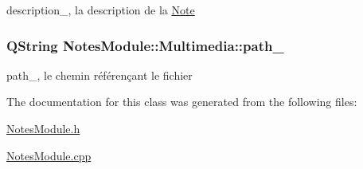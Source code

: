 description\-\_\-, la description de la \hyperlink{class_notes_module_1_1_note}{Note} 

\hypertarget{class_notes_module_1_1_multimedia_af00afad489194bafcbf6c726cce7d496}{
\subsubsection[{path\-\_\-}]{\setlength{\rightskip}{0pt plus 5cm}Q\-String Notes\-Module\-::\-Multimedia\-::path\-\_\-\hspace{0.3cm}{\ttfamily [protected]}}}\label{class_notes_module_1_1_multimedia_af00afad489194bafcbf6c726cce7d496}


path\-\_\-, le chemin référençant le fichier 



The documentation for this class was generated from the following files\-:\begin{DoxyCompactItemize}
\item 
\hyperlink{_notes_module_8h}{Notes\-Module.\-h}\item 
\hyperlink{_notes_module_8cpp}{Notes\-Module.\-cpp}\end{DoxyCompactItemize}

